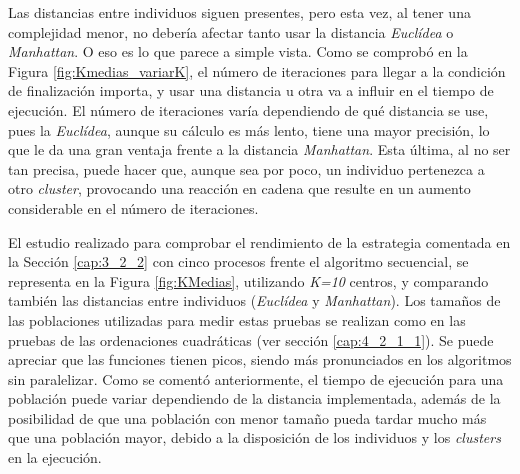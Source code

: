 
Las distancias entre individuos siguen presentes, pero esta vez, al tener una complejidad menor, no debería afectar tanto usar la distancia \textit{Euclídea} o \textit{Manhattan}. O eso es lo que parece a simple vista. Como se comprobó en la Figura \ref{fig:Kmedias_variarK}, el número de iteraciones para llegar a la condición de finalización importa, y usar una distancia u otra va a influir en el tiempo de ejecución. El número de iteraciones varía dependiendo de qué distancia se use, pues la \textit{Euclídea}, aunque su cálculo es más lento, tiene una mayor precisión, lo que le da una gran ventaja frente a la distancia \textit{Manhattan}. Esta última, al no ser tan precisa, puede hacer que, aunque sea por poco, un individuo pertenezca a otro \textit{cluster}, provocando una reacción en cadena que resulte en un aumento considerable en el número de iteraciones. 

El estudio realizado para comprobar el rendimiento de la estrategia comentada en la Sección \ref{cap:3_2_2} con cinco procesos frente el algoritmo secuencial, se representa en la Figura \ref{fig:KMedias}, utilizando \textit{K=10} centros, y comparando también las distancias entre individuos (\textit{Euclídea} y \textit{Manhattan}). Los tamaños de las poblaciones utilizadas para medir estas pruebas se realizan como en las pruebas de las ordenaciones cuadráticas (ver sección \ref{cap:4_2_1_1}). Se puede apreciar que las funciones tienen picos, siendo más pronunciados en los algoritmos sin paralelizar. Como se comentó anteriormente, el tiempo de ejecución para una población puede variar dependiendo de la distancia implementada, además de la posibilidad de que una población con menor tamaño pueda tardar mucho más que una población mayor, debido a la disposición de los individuos y los \textit{clusters} en la ejecución. 						



